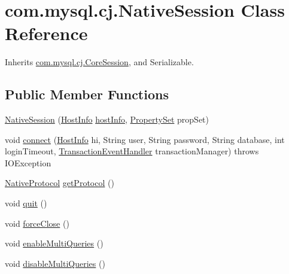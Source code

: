 \hypertarget{classcom_1_1mysql_1_1cj_1_1_native_session}{}\section{com.\+mysql.\+cj.\+Native\+Session Class Reference}
\label{classcom_1_1mysql_1_1cj_1_1_native_session}


Inherits \mbox{\hyperlink{classcom_1_1mysql_1_1cj_1_1_core_session}{com.\+mysql.\+cj.\+Core\+Session}}, and Serializable.

\subsection*{Public Member Functions}
\begin{DoxyCompactItemize}
\item 
\mbox{\hyperlink{classcom_1_1mysql_1_1cj_1_1_native_session_a054304603392a1cddd310ad3bbf02084}{Native\+Session}} (\mbox{\hyperlink{classcom_1_1mysql_1_1cj_1_1conf_1_1_host_info}{Host\+Info}} \mbox{\hyperlink{classcom_1_1mysql_1_1cj_1_1_core_session_ac60f96087dc4f9a719f136f8fb74fddf}{host\+Info}}, \mbox{\hyperlink{interfacecom_1_1mysql_1_1cj_1_1conf_1_1_property_set}{Property\+Set}} prop\+Set)
\item 
void \mbox{\hyperlink{classcom_1_1mysql_1_1cj_1_1_native_session_ae8e367a5aef181ed59a6aa6cb2345946}{connect}} (\mbox{\hyperlink{classcom_1_1mysql_1_1cj_1_1conf_1_1_host_info}{Host\+Info}} hi, String user, String password, String database, int login\+Timeout, \mbox{\hyperlink{interfacecom_1_1mysql_1_1cj_1_1_transaction_event_handler}{Transaction\+Event\+Handler}} transaction\+Manager)  throws I\+O\+Exception 
\item 
\mbox{\hyperlink{classcom_1_1mysql_1_1cj_1_1protocol_1_1a_1_1_native_protocol}{Native\+Protocol}} \mbox{\hyperlink{classcom_1_1mysql_1_1cj_1_1_native_session_ae2b07d85734e8e7fd822b1e6f09693a1}{get\+Protocol}} ()
\item 
void \mbox{\hyperlink{classcom_1_1mysql_1_1cj_1_1_native_session_a900fc165192f609b5eddb095ee729ae3}{quit}} ()
\item 
void \mbox{\hyperlink{classcom_1_1mysql_1_1cj_1_1_native_session_abb14a063cc3946e6645393135f776164}{force\+Close}} ()
\item 
void \mbox{\hyperlink{classcom_1_1mysql_1_1cj_1_1_native_session_aa9168ab8630c8828f5b8d768e6cb7bcd}{enable\+Multi\+Queries}} ()
\item 
void \mbox{\hyperlink{classcom_1_1mysql_1_1cj_1_1_native_session_ac5212fd0dd51d49b2a947110ea47d633}{disable\+Multi\+Queries}} ()

\end{DoxyCompactItemize}
